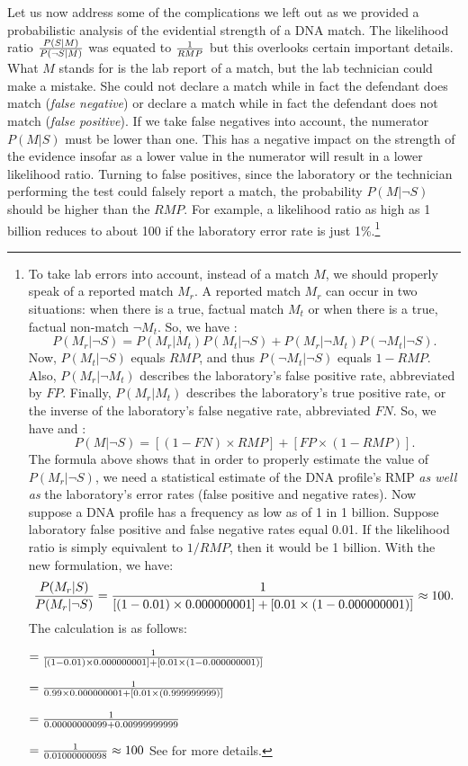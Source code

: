 \documentclass[10pt]{article}
\begin{document}
Let us now address some of the complications we left out as we provided a probabilistic 
analysis of the evidential strength of a DNA match. The likelihood ratio ${P(S | M) \over P(\neg S | M)}$ 
was equated to ${1 \over RMP}$ but this overlooks certain important details. 
What $M$ stands for is the lab report of a match, but the lab technician could make a mistake. 
She could not declare a match while in fact the defendant does match (\textit{false negative}) or  
declare a match while in fact the defendant does not match (\textit{false positive}).
If we take false negatives into account, the numerator $P(M | S)$ must be lower than one. 
This has a negative impact on the strength of the evidence insofar as a lower 
value in the numerator will result in a lower likelihood ratio. Turning to false positives, 
since the laboratory or the technician performing the test could falsely report a match, 
the probability $P(M | \neg S)$ should be higher than the $RMP$. 
For example, a likelihood ratio as high as 1 billion reduces to about 100 if the laboratory error rate is just 1\%.\footnote{To take lab errors into account, instead of a match $M$, we should properly speak of a reported match $M_r$. A reported match $M_r$ can occur in two situations: when there is a true, factual match $M_t$ or when there is a true, 
factual non-match $\neg M_t$. So, we have \citep{Thomason2003How-the-Probabi}:
%
\[
P(M_r | \neg S)= P(M_r | M_t)P(M_t| \neg S) + P( M_r | \neg M_t) P(\neg M_t | \neg S).
\]
%
Now, $P(M_t | \neg S)$ equals $RMP$, and thus $P(\neg M_t | \neg S)$ equals $1-RMP$.
Also, $P(M_r | \neg M_t)$ describes the laboratory's false positive rate, abbreviated by $FP$.
Finally, $P(M_r | M_t)$ describes the laboratory's true positive rate, or the inverse 
of the laboratory's false negative rate, abbreviated  $FN$. So, we have \citep{Thomason2003How-the-Probabi} and \citep{Buckleton2005A-Framework-for}:
%
\[P(M | \neg S)= [(1-FN) \times RMP] + [ FP \times (1- RMP)]. \]
 The formula above shows that in order to properly estimate the value of
 $P(M_r | \neg S)$, we need a statistical estimate of the DNA profile's RMP \textit{as well as} 
 the laboratory's error rates (false positive and negative rates). Now suppose a DNA profile  has a frequency as low as of 1 in 1 billion. Suppose laboratory false positive 
and false negative rates equal 0.01. If the likelihood ratio is simply equivalent 
to $1/RMP$, then it would be 1 billion. With the new formulation, we have:
%
\[ {P(M_r | S) \over P(M_r | \neg S)} = { 1 \over [(1-0.01) \times 0.000000001] + [ 0.01 \times (1- 0.000000001)]}\approx 100.\] 
%
The calculation is as follows:

$= { 1 \over [(1-0.01) \times 0.000000001] + [ 0.01 \times (1- 0.000000001)]}$

$= { 1 \over 0.99 \times 0.000000001 + [ 0.01 \times (0.999999999)]}$

$= { 1 \over 0.00000000099 + 0.00999999999}$

$= { 1 \over 0.01000000098 } \approx 100$
See \citep{Thomason2003How-the-Probabi} for more details.}
\end{document}
